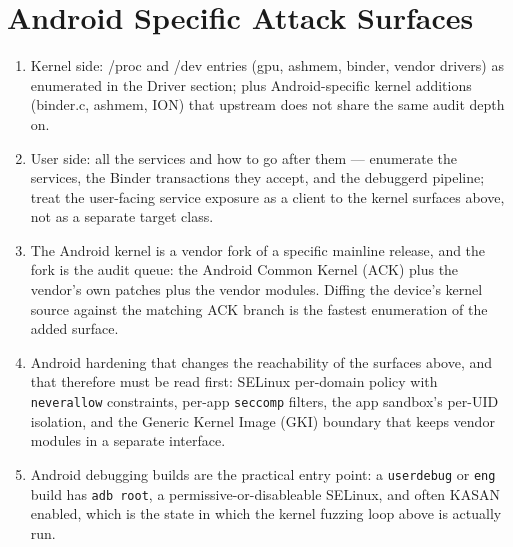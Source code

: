 \documentclass[12pt]{Training}
\begin{document}
\section*{Android Specific Attack Surfaces}
\begin{enumerate}
    \item Kernel side: /proc and /dev entries (gpu, ashmem, binder, vendor drivers) as enumerated in the Driver section; plus Android-specific kernel additions (binder.c, ashmem, ION) that upstream does not share the same audit depth on.
    \item User side: all the services and how to go after them --- enumerate the services, the Binder transactions they accept, and the debuggerd pipeline; treat the user-facing service exposure as a client to the kernel surfaces above, not as a separate target class.
    \item The Android kernel is a vendor fork of a specific mainline release, and the fork is the audit queue: the Android Common Kernel (ACK) plus the vendor's own patches plus the vendor modules. Diffing the device's kernel source against the matching ACK branch is the fastest enumeration of the added surface.
    \item Android hardening that changes the reachability of the surfaces above, and that therefore must be read first: SELinux per-domain policy with \lstinline{neverallow} constraints, per-app \lstinline{seccomp} filters, the app sandbox's per-UID isolation, and the Generic Kernel Image (GKI) boundary that keeps vendor modules in a separate interface.
    \item Android debugging builds are the practical entry point: a \lstinline{userdebug} or \lstinline{eng} build has \lstinline{adb root}, a permissive-or-disableable SELinux, and often KASAN enabled, which is the state in which the kernel fuzzing loop above is actually run.
\end{enumerate}
\end{document}
